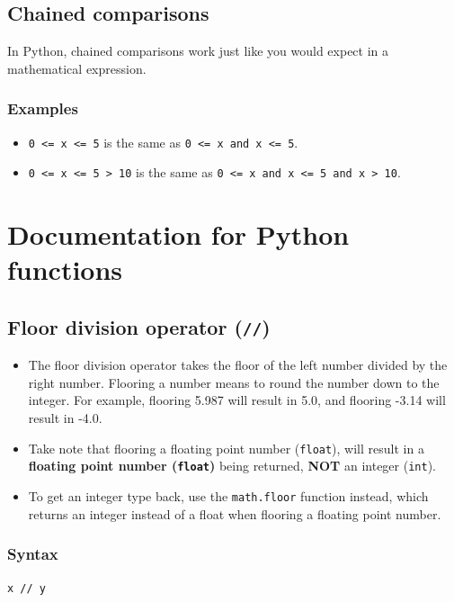 \documentclass[11pt]{article}
\begin{document}
 \newpage

\subsection{Chained comparisons}
\label{sec:org5df4a16}
In Python, chained comparisons work just like you would expect in a mathematical expression.

\subsubsection{Examples}
\label{sec:org2605ab8}
\begin{itemize}
\item \texttt{0 <= x <= 5} is the same as \texttt{0 <= x and x <= 5}.
\item \texttt{0 <= x <= 5 > 10} is the same as \texttt{0 <= x and x <= 5 and x > 10}.
\end{itemize}

 \newpage

\section{Documentation for Python functions}
\label{sec:org72126c8}

\subsection{Floor division operator (\texttt{//})}
\label{sec:org3961997}
\begin{itemize}
\item The floor division operator takes the floor of the left number divided by the right number. Flooring a number means to round the number down to the integer. For example, flooring 5.987 will result in 5.0, and flooring -3.14 will result in -4.0.
\item Take note that flooring a floating point number (\texttt{float}), will result in a \textbf{floating point number (\texttt{float})} being returned, \textbf{NOT} an integer (\texttt{int}).
\item To get an integer type back, use the \texttt{math.floor} function instead, which returns an integer instead of a float when flooring a floating point number.
\end{itemize}

\subsubsection{Syntax}
\label{sec:org11bd895}
\texttt{x // y}
\end{document}
